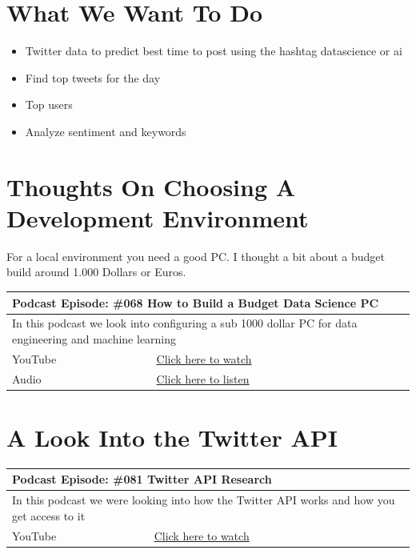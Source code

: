 \documentclass[12pt, numbers=noenddot]{scrreprt} %
\begin{document}
\chapter{What We Want To Do}

\begin{itemize}
\item Twitter data to predict best time to post using the hashtag datascience or ai
\item Find top tweets for the day
\item Top users
\item Analyze sentiment and keywords
\end{itemize}


\chapter{Thoughts On Choosing A Development Environment}

For a local environment you need a good PC. I thought a bit about a budget build around 1.000 Dollars or Euros.

\begin{table}[h]
\begin{tabular}{ll}
\hline
\multicolumn{2}{l}{\textbf{Podcast Episode:} \#068 How to Build a Budget Data Science PC} \\ \hline
\multicolumn{2}{p{15cm}}{In this podcast we look into configuring a sub 1000 dollar PC for data engineering and machine learning}         \\ \hline
\multicolumn{1}{l|}{YouTube}   & \href{https://youtu.be/00NWR-II6ek}{Click here to watch}   \\ 
\multicolumn{1}{l|}{Audio}     & \href{https://anchor.fm/andreaskayy/episodes/068-A-Budget-Data-Science-PC-Build-e45inh}{Click here to listen}   \\ \hline
\end{tabular}
\end{table}


\chapter{A Look Into the Twitter API}

\begin{table}[h]
\begin{tabular}{ll}
\hline
\multicolumn{2}{l}{\textbf{Podcast Episode:} \#081 Twitter API Research} \\ \hline
\multicolumn{2}{p{15cm}}{In this podcast we were looking into how the Twitter API works and how you get access to it}         \\ \hline
\multicolumn{1}{l|}{YouTube}   & \href{https://youtu.be/UnAXKxeIlyg}{Click here to watch}   \\ \hline
\end{tabular}
\end{table}
\end{document}
